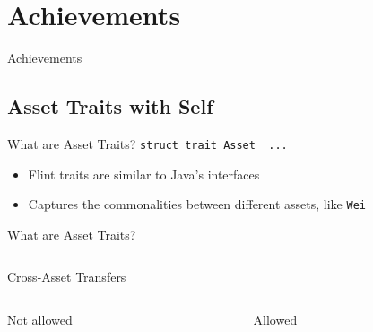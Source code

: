 \documentclass[aspectratio=169]{beamer}
\newcommand{\sectionslide}[1]{%
  \section{#1}
  \begin{frame}
  \begin{center}
    \vbox{}
    {\LARGE \usebeamercolor[fg]{title} #1}
    \par
  \end{center}
  \end{frame}
}
\begin{document}
\sectionslide{Achievements}

\subsection{Asset Traits with Self}

\begin{frame}{What are Asset Traits?}
\centering\texttt{struct trait Asset { ... }}
\\

\begin{itemize}
    \item Flint traits are similar to Java's interfaces
    \item Captures the commonalities between different assets, like {\tt Wei}
\end{itemize}
\end{frame}

\begin{frame}{What are Asset Traits?}
\centering
\inputminted{swift}{code/asset-transfer-function.flint}
\end{frame}


\begin{frame}{Cross-Asset Transfers}

\begin{columns}
\begin{column}{0.5\textwidth}
  \begin{block}{Not allowed}
    \inputminted{swift}{code/ca-not-allowed.flint}
  \end{block}
\end{column}
\begin{column}{0.5\textwidth}
  \begin{block}{Allowed}
    \inputminted{swift}{code/ca-allowed.flint}
  \end{block}
\end{column}
\end{columns}

\end{frame}
\end{document}
